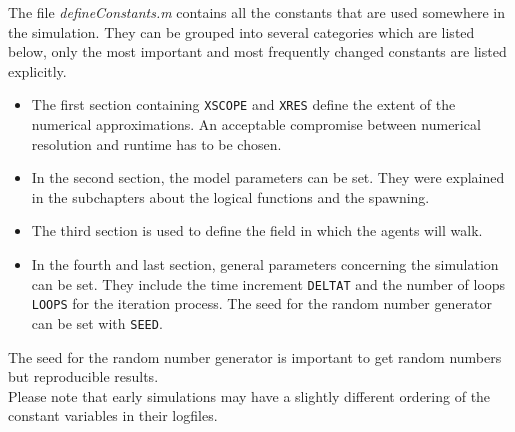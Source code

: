 
\noi The file \textit{defineConstants.m} contains all the constants that are used somewhere in the simulation. They can be grouped into several categories which are listed below, only the most important and most frequently changed constants are listed explicitly.
\begin{itemize}
	\item The first section containing \texttt{XSCOPE} and \texttt{XRES} define the extent of the numerical approximations. An acceptable compromise between numerical resolution and runtime has to be chosen.
	\item In the second section, the model parameters can be set. They were explained in the subchapters about the logical functions and the spawning.
	\item The third section is used to define the field in which the agents will walk.
	\item In the fourth and last section, general parameters concerning the simulation can be set. They include the time increment \texttt{DELTAT} and the number of loops \texttt{LOOPS} for the iteration process. The seed for the random number generator can be set with \texttt{SEED}.
\end{itemize}
\noi The seed for the random number generator is important to get random numbers but reproducible results.\\
Please note that early simulations may have a slightly different ordering of the constant variables in their logfiles.